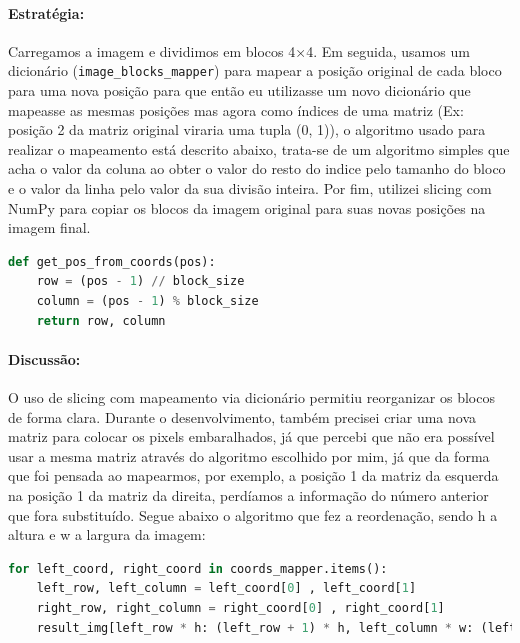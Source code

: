 \documentclass[12pt,a4paper]{report}
\begin{document}
\paragraph{Estratégia:} 
Carregamos a imagem e dividimos em blocos 4×4. Em seguida, usamos um dicionário (\texttt{image\_blocks\_mapper}) para mapear a posição original de cada bloco para uma nova posição para que então eu utilizasse um novo dicionário que mapeasse as mesmas posições mas agora como índices de uma matriz (Ex: posição 2 da matriz original viraria uma tupla (0, 1)), o algoritmo usado para realizar o mapeamento está descrito abaixo, trata-se de um algoritmo simples que acha o valor da coluna ao obter o valor do resto do indice pelo tamanho do bloco e o valor da linha pelo valor da sua divisão inteira. Por fim, utilizei slicing com NumPy para copiar os blocos da imagem original para suas novas posições na imagem final. 
\begin{lstlisting}[language=Python, caption={Algoritmo para encontrar index de linhas e colunas}]
def get_pos_from_coords(pos):
    row = (pos - 1) // block_size
    column = (pos - 1) % block_size
    return row, column

\end{lstlisting}

\paragraph{Discussão:} 
O uso de slicing com mapeamento via dicionário permitiu reorganizar os blocos de forma clara. Durante o desenvolvimento, também precisei criar uma nova matriz para colocar os pixels embaralhados, já que percebi que não era possível usar a mesma matriz através do algoritmo escolhido por mim, já que da forma que foi pensada ao mapearmos, por exemplo, a posição 1 da matriz da esquerda na posição 1 da matriz da direita, perdíamos a informação do número anterior que fora substituído. Segue abaixo o algoritmo que fez a reordenação, sendo h a altura e w a largura da imagem:
\begin{lstlisting}[language=Python, caption={Algoritmo de slicing utilizado}]
for left_coord, right_coord in coords_mapper.items():
    left_row, left_column = left_coord[0] , left_coord[1] 
    right_row, right_column = right_coord[0] , right_coord[1] 
    result_img[left_row * h: (left_row + 1) * h, left_column * w: (left_column + 1) * w ] = image[right_row * h: (right_row + 1) * h, right_column * w: (right_column + 1) * w ]

\end{lstlisting}
\end{document}
